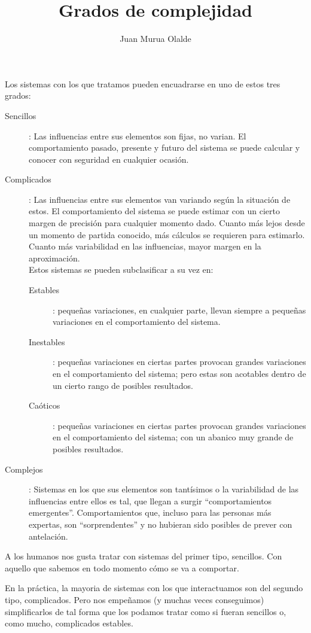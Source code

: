 \documentclass[10pt,a4paper]{article}
\author{Juan Murua Olalde}
\title{Grados de complejidad}
\begin{document}
Los sistemas con los que tratamos pueden encuadrarse en uno de estos tres grados:
\begin{description}

\item[Sencillos]: Las influencias entre sus elementos son fijas, no varian. El comportamiento pasado, presente y futuro del sistema se puede calcular y conocer con seguridad en cualquier ocasión.

\item[Complicados]: Las influencias entre sus elementos van variando según la situación de estos. El comportamiento del sistema se puede estimar con un cierto margen de precisión para cualquier momento dado. Cuanto más lejos desde un momento de partida conocido, más cálculos se requieren para estimarlo. Cuanto más variabilidad en las influencias, mayor margen en la aproximación.
\\Estos sistemas se pueden subclasificar a su vez en:
\begin{description}
\item[Estables]: pequeñas variaciones, en cualquier parte, llevan siempre a pequeñas variaciones en el comportamiento del sistema.
\item[Inestables]: pequeñas variaciones en ciertas partes provocan grandes variaciones en el comportamiento del sistema; pero estas son acotables dentro de un cierto rango de posibles resultados.
\item[Caóticos]: pequeñas variaciones en ciertas partes provocan grandes variaciones en el comportamiento del sistema; con un abanico muy grande de posibles resultados.
\end{description}

\item[Complejos]: Sistemas en los que sus elementos son tantísimos o la variabilidad de las influencias entre ellos es tal, que llegan a surgir ``comportamientos emergentes''. Comportamientos que, incluso para las personas más expertas, son ``sorprendentes'' y no hubieran sido posibles de prever con antelación.

\end{description}

A los humanos nos gusta tratar con sistemas del primer tipo, sencillos. Con aquello que sabemos en todo momento cómo se va a comportar.

En la práctica, la mayoria de sistemas con los que interactuamos son del segundo tipo, complicados. Pero nos empeñamos (y muchas veces conseguimos) simplificarlos de tal forma que los podamos tratar como si fueran sencillos o, como mucho, complicados estables.
\end{document}
